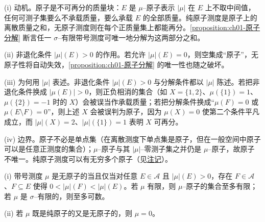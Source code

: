 \documentclass[../../main.tex]{subfiles}%
\begin{document}
\begin{remark}\label{remark:ch01-原子动机}
(i) 动机。原子是不可再分的质量块：$E$ 是 $\mu$--原子表示 $|\mu|$ 在 $E$ 上不取中间值，任何可测子集要么不承载质量，要么承载 $E$ 的全部质量。纯原子测度是原子上的离散质量之和，无原子测度则在每个正质量集上都能再分。\cref{proposition:ch01-原子分解} 断言任一 $\sigma$--有限带号测度可唯一地分解为这两部分之和。

(ii) 非退化条件 $|\mu|(E)>0$ 的作用。若允许 $|\mu|(E)=0$，则空集成“原子”，无原子性将自动失效，\cref{proposition:ch01-原子分解} 的唯一性也随之破坏。

(iii) 为何用 $|\mu|$ 表述。非退化条件 $|\mu|(E)>0$ 与分解条件都以 $|\mu|$ 陈述。若把非退化条件换成 $|\mu(E)|>0$，则正负相消的集合（如 $X=\{1,2\}$、$\mu(\{1\})=1$、$\mu(\{2\})=-1$ 时的 $X$）会被误当作承载质量；若把分解条件换成“$\mu(F)=0$ 或 $\mu(E\setminus F)=0$”，则上述 $X$ 会被误判为原子，因为 $\mu(X)=0$ 使第二个条件平凡成立，而 $|\mu|(X)=2$、$|\mu|(\{1\})=1$ 表明 $X$ 可再分。

(iv) 边界。原子不必是单点集（在离散测度下单点集是原子，但在一般空间中原子可以是任意正测度的集合）；$\mu$--原子与其 $|\mu|$--零测子集之并仍是 $\mu$--原子，故原子不唯一。纯原子测度可以有无穷多个原子（见\hyperref[remark:ch01-原子注记]{注记}）。
\end{remark}

\begin{remark}\label{remark:ch01-原子注记}
(i) 带号测度 $\mu$ 是无原子的当且仅当对任意 $E\in\mathcal{A}$ 且 $|\mu|(E)>0$，存在 $F\in\mathcal{A}$、$F\subseteq E$ 使得 $0<|\mu|(F)<|\mu|(E)$。若 $\mu$ 有限，则 $\mu$--原子的集合至多有限；若 $\mu$ 是 $\sigma$--有限的，则至多可数。

(ii) 若 $\mu$ 既是纯原子的又是无原子的，则 $\mu=0$。
\end{remark}
\end{document}
